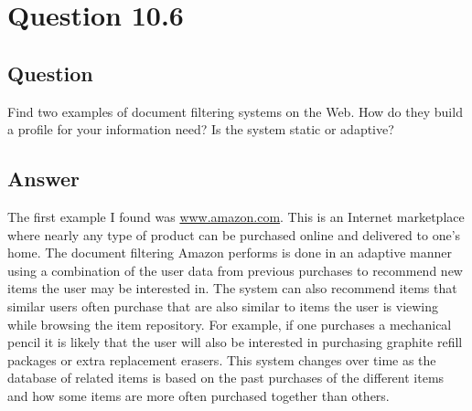 \section{Question 10.6}

\subsection{Question}
Find two examples of document filtering systems on the Web. How do they build a profile for your information need? Is the system static or adaptive?

\subsection{Answer}
The first example I found was \url{www.amazon.com}.  This is an Internet marketplace where nearly any type of product can be purchased online and delivered to one's home.  The document filtering Amazon performs is done in an adaptive manner using a combination of the user data from previous purchases to recommend new items the user may be interested in.  The system can also recommend items that similar users often purchase that are also similar to items the user is viewing while browsing the item repository.  For example, if one purchases a mechanical pencil it is likely that the user will also be interested in purchasing graphite refill packages or extra replacement erasers.  This system changes over time as the database of related items is based on the past purchases of the different items and how some items are more often purchased together than others.


